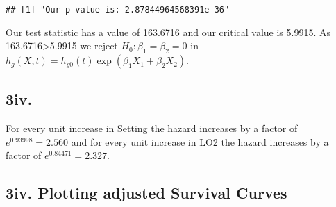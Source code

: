 \documentclass[
]{article}
\begin{document}
\begin{verbatim}
## [1] "Our p value is: 2.87844964568391e-36"
\end{verbatim}

Our test statistic has a value of 163.6716 and our critical value is
5.9915. As 163.6716\textgreater5.9915 we reject
\(H_0: \beta_1=\beta_2=0\) in
\(h_g(X,t)=h_{g0}(t)\exp(\beta_1 X_1+ \beta_2 X_2)\).

\hypertarget{iv.}{%
\subsection{3iv.}\label{iv.}}

For every unit increase in Setting the hazard increases by a factor of
\(e^{0.93998}=2.560\) and for every unit increase in LO2 the hazard
increases by a factor of \(e^{0.84471}=2.327\).

\hypertarget{iv.-plotting-adjusted-survival-curves}{%
\subsection{3iv. Plotting adjusted Survival
Curves}\label{iv.-plotting-adjusted-survival-curves}}
\end{document}
